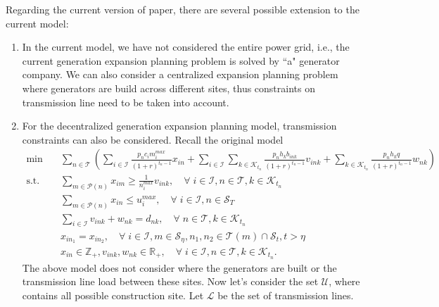\documentclass[10pt]{article}
\theoremstyle{plain}
\theoremstyle{definition}
\theoremstyle{remark}
\newcommand{\mcal}{\mathcal}
\newcommand{\cP}{\mathcal{P}}
\newcommand{\cS}{\mcal{S}}
\newcommand{\T}{\mathcal{T}}
\newcommand{\Z}{\mathbb{Z}}
\newcommand{\R}{\mathbb{R}}
\begin{document}
Regarding the current version of paper, there are several possible extension to the current model:
\begin{enumerate}[label=\emph{\roman*)}, topsep=0ex, itemsep=0ex]
\item In the current model, we have not considered the entire power grid, i.e., the current
generation expansion planning problem is solved by ``a" generator company.
We can also consider a centralized expansion planning problem where generators are build
across different sites, thus constraints on transmission line need to be taken into account.
\item For the decentralized generation expansion planning model, transmission constraints
can also be considered.
Recall the original model
\begin{subequations}
\begin{align}
\min \quad & \sum_{n\in \T}\left(\sum_{i\in \mcal{I}}\frac{p_nc_im_i^{max}}{(1+r)^{t_n-1}}x_{in}
	+ \sum_{i\in \mcal{I}}\sum_{k\in \mcal{K}_{t_n}}\frac{p_nh_kb_{ink}}{(1+r)^{t_n-1}}v_{ink} 
	+ \sum_{k\in \mcal{K}_{t_n}}\frac{p_nh_k q}{(1+r)^{t_n-1}}w_{nk}\right)\label{ge:obj}\\
\text{s.t.} \quad & \sum_{m\in \cP(n)}x_{im} \ge \frac{1}{n_i^{max}}v_{ink},
\quad \forall\; i\in \mcal{I}, n\in \T, k\in \mcal{K}_{t_n}\label{ge:capacity}\\
& \sum_{m\in \cP(n)}x_{in} \le u_i^{max}, \quad \forall\; i\in \mcal{I}, n\in \cS_T\label{ge:ub}\\
& \sum_{i\in \mcal{I}}v_{ink} + w_{nk} = d_{nk}, \quad \forall\; n\in \T, k\in \mcal{K}_{t_n}\label{ge:demand}\\
& x_{in_1} = x_{in_2}, \quad \forall\; i\in \mcal{I}, m\in \mcal{S}_{\eta}, n_1, n_2\in \T(m)\cap \mcal{S}_t,t>\eta\label{ge:na}\\
& x_{in}\in \Z_+, v_{ink}, w_{nk}\in \R_+, \quad \forall\; i\in \mcal{I}, n\in \T, k\in \mcal{K}_{t_n}.\label{ge:variable}
\end{align}
\end{subequations}
The above model does not consider where the generators are built or the transmission line
load between these sites. Now let's consider the set $\mcal{U}$, where contains all possible
construction site. Let $\mcal{L}$ be the set of transmission lines.


\end{enumerate}
\end{document}
